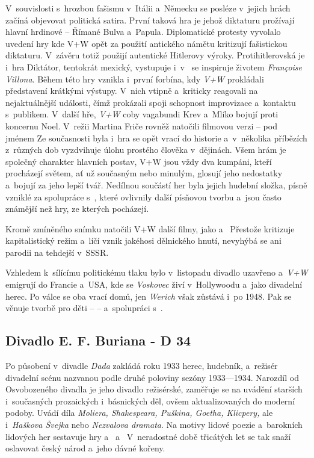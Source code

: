 V~souvislosti s~hrozbou fašismu v~Itálii a~Německu se posléze v~jejich
hrách začíná objevovat politická satira. První taková hra je
 jehož diktaturu prožívají hlavní hrdinové -- Římané Bulva
a~Papula. Diplomatické protesty vyvolalo uvedení hry 
kde V+W opět za použití antického námětu kritizují fašistickou
diktaturu. V~závěru totiž použijí autentické Hitlerovy výroky.
Protihitlerovská je i~hra  Diktátor, tentokrát
mexický, vystupuje i~v~ 
se inspiruje životem \emph{Fran\c coise Villona}. Během této hry vznikla
i~první forbína, kdy \emph{V+W} prokládali představení krátkými výstupy.
V~nich vtipně a~kriticky reagovali na nejaktuálnější události, čímž
prokázali spoji schopnost improvizace a~kontaktu s~publikem. V~další
hře,  \emph{V+W} coby vagabundi Krev a~Mlíko bojují
proti koncernu Noel. V~režii Martina Friče rovněž natočili filmovou
verzi -- pod jménem  Ze současnosti byla i~hra
  se opět vrací do historie
a~v~několika příbězích z~různých dob vyzdvihuje úlohu prostého člověka
v~dějinách. Všem hrám je společný charakter hlavních postav, V+W jsou vždy
dva kumpáni, kteří procházejí světem, ať už současným nebo minulým,
glosují jeho nedostatky a~bojují za jeho lepší tvář. Nedílnou součástí
her byla jejich hudební složka, písně vzniklé za spolupráce
s~, které ovlivnily další
písňovou tvorbu a~jsou často známější než hry, ze kterých pocházejí.

Kromě zmíněného snímku  natočili V+W další filmy,
jako   a~
Přestože  kritizuje kapitalistický režim a~líčí vznik
jakéhosi dělnického hnutí, nevyhýbá se ani parodii na tehdejší
 v~SSSR.

Vzhledem k~sílícímu politickému tlaku bylo v~listopadu 
divadlo uzavřeno a~\emph{V+W} emigrují do Francie a~USA, kde se
\emph{Voskovec} živí v~Hollywoodu a~jako divadelní herec. Po válce se
oba vrací domů, jen \emph{Werich} však zůstává i~po 1948. Pak se věnuje tvorbě
pro děti --  -- a~spolupráci s~.

\subsection*{Divadlo E. F. Buriana - D 34}
Po působení v~divadle \emph{Dada} zakládá roku 1933 herec, hudebník,
a~režisér  divadelní scénu nazvanou  podle druhé poloviny sezóny 1933---1934. Narozdíl od
Osvobozeného divadla je jeho divadlo režisérské, zaměřuje se na uvádění
starších i~současných prozaických i~básnických děl, ovšem
aktualizovaných do moderní podoby. Uvádí díla \emph{Moliera,
Shakespeara, Puškina, Goetha, Klicpery,} ale i~\emph{Haškova Švejka}
nebo \emph{Nezvalova dramata}. Na motivy lidové poezie a~barokních
lidových her sestavuje hry  a~ a~ V~neradostné době třicátých let se tak snaží oslavovat
český národ a~jeho dávné kořeny.


